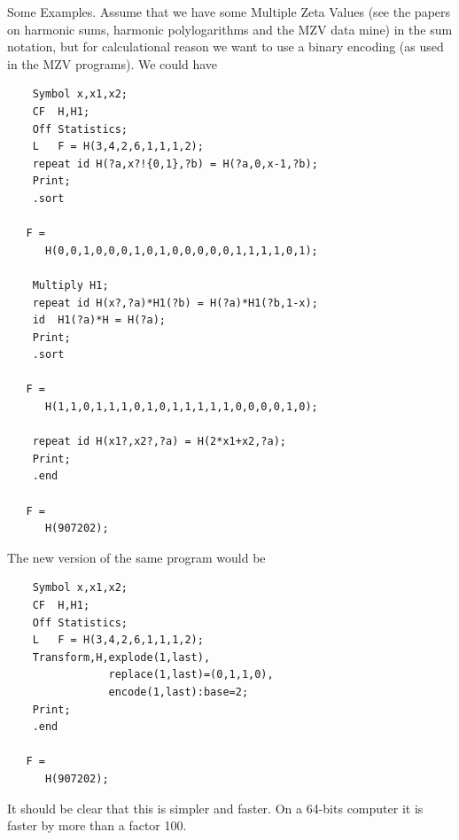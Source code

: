 



Some Examples. Assume that we have some Multiple Zeta Values (see the papers on harmonic sums, harmonic polylogarithms and the MZV 
data mine) in the sum notation, but for calculational 
reason we want to use a binary encoding (as used in the MZV programs). We 
could have
\begin{verbatim}
    Symbol x,x1,x2;
    CF  H,H1;
    Off Statistics;
    L   F = H(3,4,2,6,1,1,1,2);
    repeat id H(?a,x?!{0,1},?b) = H(?a,0,x-1,?b);
    Print;
    .sort

   F =
      H(0,0,1,0,0,0,1,0,1,0,0,0,0,0,1,1,1,1,0,1);

    Multiply H1;
    repeat id H(x?,?a)*H1(?b) = H(?a)*H1(?b,1-x);
    id  H1(?a)*H = H(?a);
    Print;
    .sort

   F =
      H(1,1,0,1,1,1,0,1,0,1,1,1,1,1,0,0,0,0,1,0);

    repeat id H(x1?,x2?,?a) = H(2*x1+x2,?a);
    Print;
    .end

   F =
      H(907202);
\end{verbatim}
The new version of the same program would be
\begin{verbatim}
    Symbol x,x1,x2;
    CF  H,H1;
    Off Statistics;
    L   F = H(3,4,2,6,1,1,1,2);
    Transform,H,explode(1,last),
                replace(1,last)=(0,1,1,0),
                encode(1,last):base=2;
    Print;
    .end

   F =
      H(907202);
\end{verbatim}
It should be clear that this is simpler and faster. On a 64-bits computer 
it is faster by more than a factor 100.

